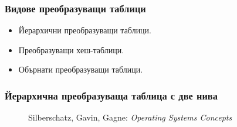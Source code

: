 \documentclass[ignorenonframetext, hyperref=unicode]{beamer}
\begin{document}
\begin{frame}
\frametitle{Видове преобразуващи таблици}
\begin{itemize}
  \item Йерархични преобразуващи таблици.
  \item Преобразуващи хеш-таблици.
  \item Обърнати преобразуващи таблици.
\end{itemize}
\end{frame}


\begin{frame}
\frametitle{Йерархична преобразуваща таблица с две нива}
\begin{figure}[h]
\center
{}
\caption{Silberschatz, Gavin, Gagne: {\em Operating Systems Concepts}}
\end{figure}
\end{frame}
\end{document}
